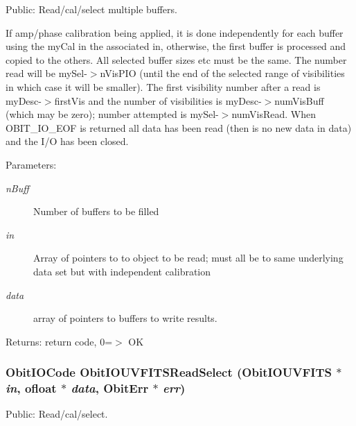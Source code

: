 Public: Read/cal/select multiple buffers. 

If amp/phase calibration being applied, it is done independently for each buffer using the my\-Cal in the associated in, otherwise, the first buffer is processed and copied to the others. All selected buffer sizes etc must be the same. The number read will be my\-Sel-$>$n\-Vis\-PIO (until the end of the selected range of visibilities in which case it will be smaller). The first visibility number after a read is my\-Desc-$>$first\-Vis and the number of visibilities is my\-Desc-$>$num\-Vis\-Buff (which may be zero); number attempted is my\-Sel-$>$num\-Vis\-Read. When OBIT\_\-IO\_\-EOF is returned all data has been read (then is no new data in data) and the I/O has been closed. \begin{Desc}
\item[Parameters:]
\begin{description}
\item[{\em n\-Buff}]Number of buffers to be filled \item[{\em in}]Array of pointers to to object to be read; must all be to same underlying data set but with independent calibration \item[{\em data}]array of pointers to buffers to write results. \end{description}
\end{Desc}
\begin{Desc}
\item[Returns:]return code, 0=$>$ OK \end{Desc}
\subsubsection{\setlength{\rightskip}{0pt plus 5cm}Obit\-IOCode Obit\-IOUVFITSRead\-Select ({\bf Obit\-IOUVFITS} $\ast$ {\em in}, {\bf ofloat} $\ast$ {\em data}, {\bf Obit\-Err} $\ast$ {\em err})}\label{ObitIOUVFITS_8c_a28}


Public: Read/cal/select. 

